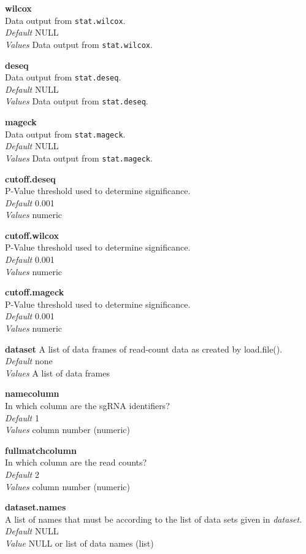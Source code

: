 \documentclass[]{article}
\begin{document}
\textbf{wilcox}\\
Data output from \texttt{stat.wilcox}.\\
\emph{Default} NULL\\
\emph{Values} Data output from \texttt{stat.wilcox}.

\textbf{deseq}\\
Data output from \texttt{stat.deseq}.\\
\emph{Default} NULL\\
\emph{Values} Data output from \texttt{stat.deseq}.

\textbf{mageck}\\
Data output from \texttt{stat.mageck}.\\
\emph{Default} NULL\\
\emph{Values} Data output from \texttt{stat.mageck}.

\textbf{cutoff.deseq}\\
P-Value threshold used to determine significance.\\
\emph{Default} 0.001\\
\emph{Values} numeric

\textbf{cutoff.wilcox}\\
P-Value threshold used to determine significance.\\
\emph{Default} 0.001\\
\emph{Values} numeric

\textbf{cutoff.mageck}\\
P-Value threshold used to determine significance.\\
\emph{Default} 0.001\\
\emph{Values} numeric

\textbf{dataset} A list of data frames of read-count data as created by
load.file().\\
\emph{Default} none\\
\emph{Values} A list of data frames

\textbf{namecolumn}\\
In which column are the sgRNA identifiers?\\
\emph{Default} 1\\
\emph{Values} column number (numeric)

\textbf{fullmatchcolumn}\\
In which column are the read counts?\\
\emph{Default} 2\\
\emph{Values} column number (numeric)

\textbf{dataset.names}\\
A list of names that must be according to the list of data sets given in
\emph{dataset}.\\
\emph{Default} NULL\\
\emph{Value} NULL or list of data names (list)
\end{document}
